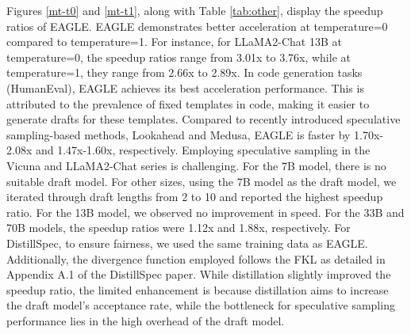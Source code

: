 \documentclass{article}
\theoremstyle{plain}
\theoremstyle{definition}
\theoremstyle{remark}
\begin{document}
Figures \ref{mt-t0} and \ref{mt-t1}, along with Table \ref{tab:other}, display the speedup ratios of EAGLE. EAGLE demonstrates better acceleration at temperature=0 compared to temperature=1. For instance, for LLaMA2-Chat 13B at temperature=0, the speedup ratios range from 3.01x to 3.76x, while at temperature=1, they range from 2.66x to 2.89x. 
In code generation tasks (HumanEval), EAGLE achieves its best acceleration performance. This is attributed to the prevalence of fixed templates in code, making it easier to generate drafts for these templates. Compared to recently introduced speculative sampling-based methods, Lookahead and Medusa, EAGLE is faster by 1.70x-2.08x and 1.47x-1.60x, respectively. 
Employing speculative sampling in the Vicuna and LLaMA2-Chat series is challenging. For the 7B model, there is no suitable draft model. For other sizes, using the 7B model as the draft model, we iterated through draft lengths from 2 to 10 and reported the highest speedup ratio. For the 13B model, we observed no improvement in speed. For the 33B and 70B models, the speedup ratios were 1.12x and 1.88x, respectively. For DistillSpec, to ensure fairness, we used the same training data as EAGLE. Additionally, the divergence function employed follows the FKL as detailed in Appendix A.1 of the DistillSpec paper.
While distillation slightly improved the speedup ratio, the limited enhancement is because distillation aims to increase the draft model's acceptance rate, while the bottleneck for speculative sampling performance lies in the high overhead of the draft model. 
\end{document}
